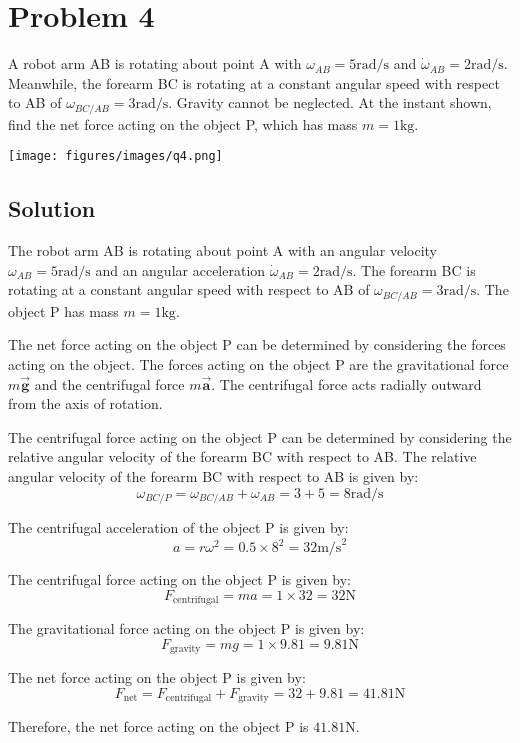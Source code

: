 \section*{Problem 4}

A robot arm AB is rotating about point A with \( \omega_{AB} = 5 \text{rad/s} \) and \( \dot\omega_{AB} = 2 \text{rad/s} \).
Meanwhile, the forearm BC is rotating at a constant angular speed with respect to AB of \( \omega_{BC/AB} = 3 \text{rad/s} \).
Gravity cannot be neglected.
At the instant shown, find the net force acting on the object P, which has mass \( m = 1\text{kg} \).

\begin{figure*}[h]
    \centering
    \texttt{[image: figures/images/q4.png]}
\end{figure*}

\subsection*{Solution}

The robot arm AB is rotating about point A with an angular velocity \( \omega_{AB} = 5 \text{rad/s} \) and an angular acceleration \( \dot\omega_{AB} = 2 \text{rad/s} \).
The forearm BC is rotating at a constant angular speed with respect to AB of \( \omega_{BC/AB} = 3 \text{rad/s} \).
The object P has mass \( m = 1\text{kg} \).

The net force acting on the object P can be determined by considering the forces acting on the object.
The forces acting on the object P are the gravitational force \( m\vec{\mathbf{g}} \) and the centrifugal force \( m\vec{\mathbf{a}} \).
The centrifugal force acts radially outward from the axis of rotation.

The centrifugal force acting on the object P can be determined by considering the relative angular velocity of the forearm BC with respect to AB.
The relative angular velocity of the forearm BC with respect to AB is given by:
\[
    \omega_{BC/P} = \omega_{BC/AB} + \omega_{AB} = 3 + 5 = 8 \text{rad/s}
\]

The centrifugal acceleration of the object P is given by:
\[
    a = r\omega^2 = 0.5 \times 8^2 = 32 \text{m/s}^2
\]

The centrifugal force acting on the object P is given by:
\[
    F_{\text{centrifugal}} = ma = 1 \times 32 = 32 \text{N}
\]

The gravitational force acting on the object P is given by:
\[
    F_{\text{gravity}} = mg = 1 \times 9.81 = 9.81 \text{N}
\]

The net force acting on the object P is given by:
\[
    F_{\text{net}} = F_{\text{centrifugal}} + F_{\text{gravity}} = 32 + 9.81 = 41.81 \text{N}
\]

Therefore, the net force acting on the object P is \( 41.81 \text{N} \).
